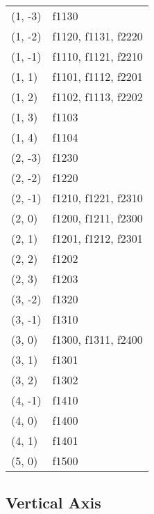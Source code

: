 \begin{longtable}[]{@{}ll@{}}
(1, -3) & f1130 \\
(1, -2) & f1120, f1131, f2220 \\
(1, -1) & f1110, f1121, f2210 \\
(1, 1) & f1101, f1112, f2201 \\
(1, 2) & f1102, f1113, f2202 \\
(1, 3) & f1103 \\
(1, 4) & f1104 \\
(2, -3) & f1230 \\
(2, -2) & f1220 \\
(2, -1) & f1210, f1221, f2310 \\
(2, 0) & f1200, f1211, f2300 \\
(2, 1) & f1201, f1212, f2301 \\
(2, 2) & f1202 \\
(2, 3) & f1203 \\
(3, -2) & f1320 \\
(3, -1) & f1310 \\
(3, 0) & f1300, f1311, f2400 \\
(3, 1) & f1301 \\
(3, 2) & f1302 \\
(4, -1) & f1410 \\
(4, 0) & f1400 \\
(4, 1) & f1401 \\
(5, 0) & f1500 \\
\bottomrule()
\end{longtable}

\subsection{Vertical Axis}

